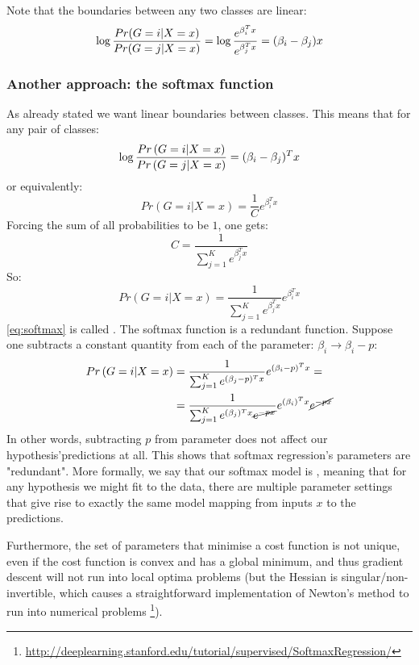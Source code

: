 Note that the boundaries between any two classes are linear:
\begin{equation*}
\log \frac{Pr(G=i|X=x)}{Pr(G=j|X=x)} = \log \frac{e^{\beta_i^T x}}{e^{\beta_j^T x}} = \br{\beta_i -\beta_j}x
\end{equation*}

\subsubsection{Another approach: the softmax function}
\label{sssec:softmax}
As already stated we want linear boundaries between classes. This means that for any pair of classes:
\begin{equation}
\log \frac{Pr\left(G=i|X=x\right)}{Pr\left(G=j|X=x\right)} = (\beta_i - \mathbf{\beta}_j)^T x 
\end{equation}
or equivalently:
\begin{equation}
Pr\left(G=i|X=x\right) = \frac{1}{C}e^{\beta_i ^T x }
\end{equation}
Forcing the sum of all probabilities to be $1$, one gets:
\begin{equation}
C= \frac{1}{\sum_{j=1}^Ke^{\beta_j ^T x }}
\end{equation}
So:
\begin{equation}
Pr\left(G=i|X=x\right) = \frac{1}{\sum_{j=1}^Ke^{\beta_j ^T x}}e^{\beta_i ^T x }
\label{eq:softmax}
\end{equation}
\autoref{eq:softmax} is called . 
The softmax function is a redundant function. Suppose one subtracts a constant quantity from each of the parameter: $\beta_i \rightarrow \beta_i - p$:
\begin{equation}
\begin{aligned}
Pr\left(G=i|X=x\right) &= \frac{1}{\sum_{j=1}^Ke^{(\beta_j-p) ^T x}}e^{(\beta_i-p)  ^T x } =\\
&= \frac{1}{\sum_{j=1}^Ke^{(\beta_j) ^T x}\cancel{e^{-px}}}e^{(\beta_i)  ^T x }\cancel{e^{-px}}
\end{aligned}
\end{equation}
In other words, subtracting $p$ from parameter does not affect our hypothesis'predictions at all. This shows that softmax regression's parameters are "redundant". More formally, we say that our softmax model is , meaning that for any hypothesis we might fit to the data, there are multiple parameter settings that give rise to exactly the same model mapping from inputs $x$ to the predictions.

Furthermore, the set of parameters that minimise a cost function is not unique, even if the cost function is convex and has a global minimum, and thus gradient descent will not run into local optima problems (but the Hessian is singular/non-invertible, which causes a straightforward implementation of Newton’s method to run into numerical problems \footnote{\url{http://deeplearning.stanford.edu/tutorial/supervised/SoftmaxRegression/}}).

